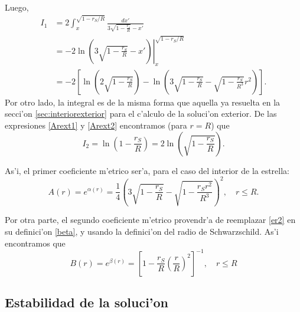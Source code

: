 Luego,
\begin{align}
I_1 &= 2\int_x^{\sqrt{1-{r_S}/{R}}}\frac{dx'}{3\sqrt{1-\frac{r_s}{R}}-x'}\\
&=-2\ln\left.\left(3\sqrt{1-\frac{r_S}{R}}-x'\right)\right|_{x}^{\sqrt{1-{r_S}/{R}}}\\
&=-2\left[\ln\left(2\sqrt{1-\frac{r_S}{R}}\right)-\ln\left(3\sqrt{1-\frac{r_S}{R}}-\sqrt{1-\frac{r_S}{R^3}}r^2\right)\right].
\end{align}
Por otro lado, la integral es de la misma forma que aquella ya resuelta en la secci'on \ref{sec:interiorexterior} para el c'alculo de la soluci'on exterior. De las expresiones \eqref{Arext1} y \eqref{Arext2} encontramos (para $r=R$) que
\begin{equation}
I_2=\ln\left(1-\frac{r_S}{R}\right)=2\ln\left(\sqrt{1-\frac{r_S}{R}}\right).
\end{equation}

As'i, el primer coeficiente m'etrico ser'a, para el caso del interior de la estrella:
\begin{equation}
\boxed{A(r)=e^{\alpha(r)}=\frac{1}{4}\left(3\sqrt{1-\frac{r_S}{R}}-\sqrt{1-\frac{r_Sr^2}{R^3}}\right)^2,\quad r\leq R.}
\end{equation}

Por otra parte, el segundo coeficiente m'etrico provendr'a de reemplazar \eqref{er2} en su definici'on \eqref{beta}, y usando la definici'on del radio de Schwarzschild. As'i encontramos que
\begin{equation}
 \boxed{B(r)=e^{\beta(r)}=\left[1-\frac{r_S}{R}\left(\frac{r}{R}\right)^2\right]^{-1},\quad r\leq R}
\end{equation}

\subsection{Estabilidad de la soluci'on}

